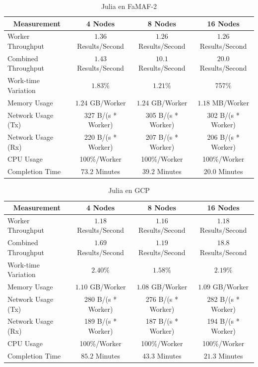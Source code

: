 \documentclass[11pt]{article}
\begin{document}
\begin{table}[H]
\centering
\begin{tabular}{|l|c|c|c|}
\hline
\multicolumn{1}{|c|}{Measurement} & 4 Nodes & 8 Nodes & 16 Nodes \\ \hline
Worker Throughput & $1.36$ Results/Second & $1.26$ Results/Second & $1.26$ Results/Second \\ \hline
Combined Throughput & $1.43$ Results/Second & $10.1$ Results/Second & $20.0$ Results/Second \\ \hline
Work-time Variation & $1.83\%$& $1.21\%$& 757\% \\ \hline
Memory Usage & $1.24$ GB/Worker & $1.24$ GB/Worker & $1.18$ MB/Worker \\ \hline
Network Usage (Tx) & 327 B/(s * Worker) & 305 B/(s * Worker) & 302 B/(s * Worker) \\ \hline
Network Usage (Rx) & 220 B/(s * Worker) & 207 B/(s * Worker) & 206 B/(s * Worker) \\ \hline
CPU Usage & 100\%/Worker & 100\%/Worker & 100\%/Worker \\ \hline
Completion Time & $73.2$ Minutes & $39.2$ Minutes & $20.0$ Minutes \\ \hline
\end{tabular}
\caption{Julia en FaMAF-2}
\end{table}

\begin{table}[H]
\centering
\begin{tabular}{|l|c|c|c|}
\hline
\multicolumn{1}{|c|}{Measurement} & 4 Nodes & 8 Nodes & 16 Nodes \\ \hline
Worker Throughput & $1.18$ Results/Second & $1.16$ Results/Second & $1.18$ Results/Second \\ \hline
Combined Throughput & $1.69$ Results/Second & $1.19$ Results/Second & $18.8$ Results/Second \\ \hline
Work-time Variation & $2.40\%$& $1.58\%$& $2.19\%$\\ \hline
Memory Usage & $1.10$ GB/Worker & $1.08$ GB/Worker & $1.09$ GB/Worker \\ \hline
Network Usage (Tx) & 280 B/(s * Worker) & 276 B/(s * Worker) & 282 B/(s * Worker) \\ \hline
Network Usage (Rx) & 189 B/(s * Worker) & 187 B/(s * Worker) & 194 B/(s * Worker) \\ \hline
CPU Usage & 100\%/Worker & 100\%/Worker & 100\%/Worker \\ \hline
Completion Time & $85.2$ Minutes & $43.3$ Minutes & $21.3$ Minutes \\ \hline
\end{tabular}
\caption{Julia en GCP}
\end{table}
\end{document}
